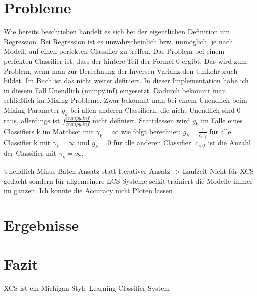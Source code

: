 \documentclass{ocsmnar}
\begin{document}
\section{Probleme}
Wie bereits beschrieben handelt es sich bei der eigentlichen Definition um Regression. Bei Regression ist es unwahrscheinlich bzw. unmöglich, je nach Modell, auf einen perfekten Classifier zu treffen. Das Problem bei einem perfekten Classifier ist, dass der hintere Teil der Formel 0 ergibt. Das wird zum Problem, wenn man zur Berechnung der Inversen Varianz den Umkehrbruch bildet. Im Buch ist das nicht weiter definiert. In dieser Implementation habe ich in diesem Fall Unendlich (numpy.inf) eingesetzt. Dadurch bekommt man schließlich im Mixing Probleme. Zwar bekommt man bei einem Unendlich beim Mixing-Parameter $g_{k}$ bei allen anderen Classifiern, die nicht Unendlich sind 0 raus, allerdings ist $f\frac{numpy.inf}{numpy.inf}$ nicht definiert. Stattdessen wird $g_{k}$ im Falle eines Classifiers k im Matchset mit $\gamma_{k} = \infty$ wie folgt berechnet: $g_{k} = \frac{1}{c_{inf}} $ für alle Classifier k mit $\gamma_{k} = \infty$ und $g_{k} = 0$ für alle anderen Classifier. $c_{inf}$ ist die Anzahl der Classifier mit $\gamma_{k} = \infty$.

Unendlich 
Minus 
Batch Ansatz statt Iterativer Ansatz -> Laufzeit
Nicht für XCS gedacht sondern für allgemeinere LCS Systeme 
scikit trainiert die Modelle immer im ganzen. Ich konnte die Accuracy nicht Ploten lassen 

\section{Ergebnisse}

\section{Fazit}





XCS ist ein Michigan-Style Learning Classifier System 











\end{document}
